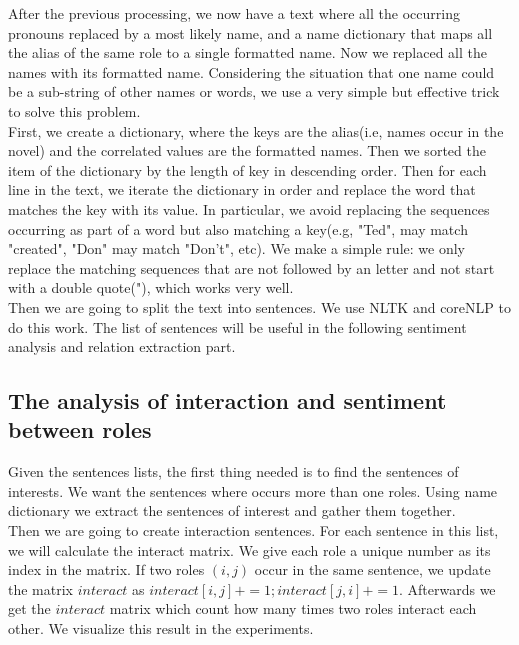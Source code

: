 \documentclass[11pt]{article}
\begin{document}
After the previous processing, we now have a text where all the occurring pronouns replaced by a most likely name, and a name dictionary that maps all the alias of the same role to a single formatted name. Now we replaced all the names with its formatted name. Considering the situation that one name could be a sub-string of other names or words, we use a very simple but effective trick to solve this problem. \\
First, we create a dictionary, where the keys are the alias(i.e, names occur in the novel) and the correlated values are the formatted names. Then we sorted the item of the dictionary by the length of key in descending order. Then for each line in the text, we iterate the dictionary in order and replace the word that matches the key with its value. In particular, we avoid replacing the sequences occurring as part of a word but also matching a key(e.g, "Ted", may match "created", "Don" may match "Don't", etc). We make a simple rule: we only replace the matching sequences that are not followed by an letter and not start with a double quote("), which works very well. \\ 

Then we are going to split the text into sentences. We use NLTK and coreNLP to do this work. The list of sentences will be useful in the following sentiment analysis and relation extraction part.

\subsection{The analysis of interaction and sentiment between roles} %
Given the sentences lists, the first thing needed is to find the sentences of interests. We want the sentences where occurs more than one roles. Using name dictionary we extract the sentences of interest and gather them together. \\

Then we are going to create interaction sentences. For each sentence in this list, we will calculate the interact matrix. We give each role a unique number as its index in the matrix. If two roles $(i, j)$ occur in the same sentence, we update the matrix $interact$ as $interact[i, j] += 1; interact[j, i] += 1$. Afterwards we get the $interact$ matrix which count how many times two roles interact each other. We visualize this result in the experiments.\\
\end{document}
